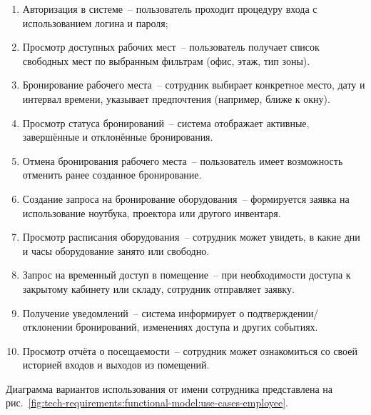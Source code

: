 \begin{enumerate}
    \item Авторизация в системе~-- пользователь проходит процедуру входа с использованием логина и пароля;
    \item Просмотр доступных рабочих мест~-- пользователь получает список свободных мест по выбранным фильтрам (офис, этаж, тип зоны).
    \item Бронирование рабочего места~-- сотрудник выбирает конкретное место, дату и интервал времени, указывает предпочтения (например, ближе к окну).
    \item Просмотр статуса бронирований~-- система отображает активные, завершённые и отклонённые бронирования.
    \item Отмена бронирования рабочего места~-- пользователь имеет возможность отменить ранее созданное бронирование.
    \item Создание запроса на бронирование оборудования~-- формируется заявка на использование ноутбука, проектора или другого инвентаря.
    \item Просмотр расписания оборудования~-- сотрудник может увидеть, в какие дни и часы оборудование занято или свободно.
    \item Запрос на временный доступ в помещение~-- при необходимости доступа к закрытому кабинету или складу, сотрудник отправляет заявку.
    \item Получение уведомлений~-- система информирует о подтверждении/отклонении бронирований, изменениях доступа и других событиях.
    \item Просмотр отчёта о посещаемости~-- сотрудник может ознакомиться со своей историей входов и выходов из помещений.
\end{enumerate}

Диаграмма вариантов использования от имени сотрудника представлена на рис.~\ref{fig:tech-requirements:functional-model:use-cases-employee}.


